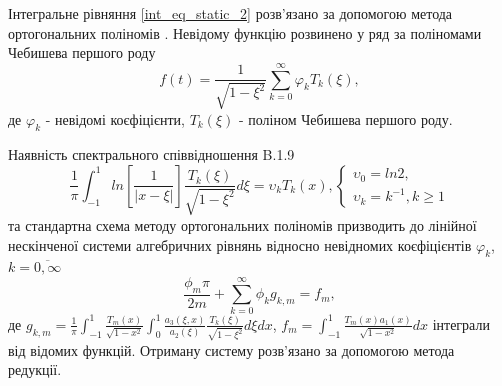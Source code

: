 Інтегральне рівняння \eqref{int_eq_static_2} розв'язано за допомогою метода ортогональних поліномів \cite{popov_3}.
Невідому функцію розвинено у ряд за поліномами Чебишева першого роду
\begin{equation}\label{unk_fun_static_2}
    f(t) = \frac{1}{\sqrt{1 - \xi^2}} \sum_{k=0}^{\infty} \varphi_k T_{k}(\xi),
\end{equation}
де $\varphi_k$ - невідомі коєфіцієнти, $T_{k}(\xi)$ - поліном Чебишева першого роду.

Наявність спектрального співвідношення B.1.9 \cite{ortogonal}
\begin{equation}
    \frac{1}{\pi} \int_{-1}^{1} ln\left[ \frac{1}{\lvert x - \xi \rvert} \right] \frac{T_k(\xi)}{\sqrt{1 - \xi^2}} d\xi = \upsilon_k T_k(x),
    \begin{cases}
        \upsilon_0 = ln 2, \\
        \upsilon_k = k^{-1}, k \ge 1
    \end{cases}
\end{equation} 
та стандартна схема методу ортогональних поліномів призводить до лінійної нескінченої системи алгебричних рівнянь відносно невідномих коєфіцієнтів $\varphi_k$, $k=\overline{0, \infty}$
\begin{equation}\label{int_system_static_2}
    \frac{\phi_m \pi}{2m} + \sum_{k=0}^{\infty} \phi_k g_{k, m} = f_m,
\end{equation}
де $g_{k, m} = \frac{1}{\pi} \int_{-1}^{1} \frac{T_{m}(x)}{\sqrt{1 - x^2}} \int_{0}^{1} \frac{a_3(\xi, x )}{a_2(\xi)} \frac{T_{k}(\xi)}{\sqrt{1 - \xi^2}} d\xi dx$,
$f_m = \int_{-1}^{1} \frac{T_{m}(x) a_1(x)}{\sqrt{1 - x^2}} dx$ інтеграли від відомих функцій.
Отриману систему розв'язано за допомогою метода редукції.


